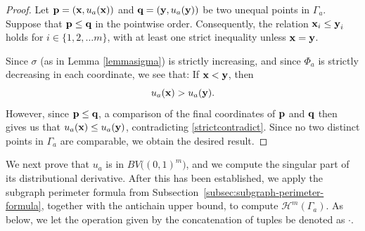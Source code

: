 \documentclass{publicadapt}
\begin{document}
\begin{proof}
 Let $\text{{\bf p}} = (\text{{\bf x}}, u_{a}(\text{{\bf x}}))$ and $\text{{\bf q}} = (\text{{\bf y}}, u_a(\text{{\bf y}}))$ be two unequal points in 
 $\Gamma_a$. Suppose that $\text{{\bf p}} \leq \text{{\bf q}}$
 in the pointwise order. Consequently, the relation $\text{{\bf x}}_i \leq \text{{\bf y}}_i$ holds
 for $i \in \{ 1, 2, \ldots m \}$, with at least one strict inequality unless $\text{{\bf x}} = \text{{\bf y}}$. 

 Since $\sigma$ (as in Lemma \ref{lemmasigma}) is strictly increasing, and since $\Phi_a$
 is strictly decreasing in each coordinate, we see that: If $\text{{\bf x}} < \text{{\bf y}}$, then 
\begin{equation}\label{strictcontradict}
 u_{a}(\text{{\bf x}}) > u_a(\text{{\bf y}}). 
\end{equation}
 However, since $\text{{\bf p}} \leq \text{{\bf q}}$,
 a comparison of the final coordinates of $\text{{\bf p}}$ and $\text{{\bf q}}$ then gives us that 
 $u_{a}(\text{{\bf x}}) \leq u_a(\text{{\bf y}})$, contradicting \eqref{strictcontradict}. 
 Since no two distinct points in $\Gamma_a$ are comparable, we obtain the desired result. 
\end{proof}

 We next prove that $u_a$ is in $BV\big( (0,1)^m \big)$, and we compute 
 the singular part of its distributional derivative. After this has been established, we apply the subgraph perimeter 
 formula from Subsection~\ref{subsec:subgraph-perimeter-formula}, together with the antichain upper bound, to compute \(\mathcal H^m(\Gamma_a)\).
 As below, we let the operation given by the concatenation of tuples be denoted as $\cdot$. 
\end{document}
